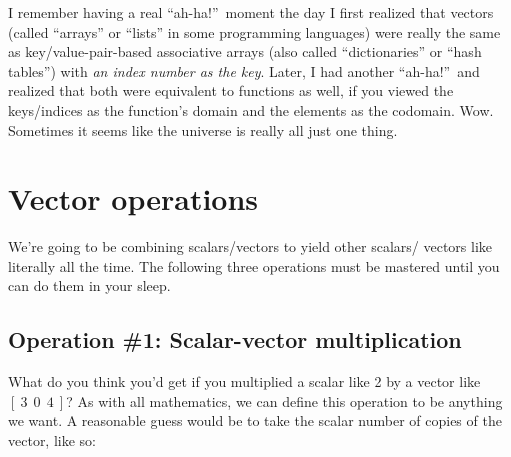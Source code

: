 
I remember having a real ``ah-ha!''~moment the day I first realized that
vectors (called ``arrays'' or ``lists'' in some programming languages) were
really the same as key/value-pair-based associative arrays (also called
``dictionaries'' or ``hash tables'') with \textit{an index number as the key}.
Later, I had another ``ah-ha!''~and realized that both were equivalent to
functions as well, if you viewed the keys/indices as the function's domain and
the elements as the codomain. Wow. Sometimes it seems like the universe is
really all just one thing.

%
%
%
%
%
%
%
%
%
%
%
%
%
%
%
%
%
%
%
%
%
%
%
%
%
%
%
%
%
%
%
%
%
%
%
%
%
%
%
%
%


\section{Vector operations}
\label{vectorOps}

We're going to be combining scalars/vectors to yield other scalars/ vectors
like literally all the time. The following three operations must be mastered
until you can do them in your sleep.

\subsection{Operation \#1: Scalar-vector multiplication}

\label{scalarVectorMultiplication}

What do you think you'd get if you multiplied a scalar like 2 by a vector like
$[\ 3\ \ 0\ \ 4\ ]$? As with all mathematics, we can define this operation to
be anything we want. A reasonable guess would be to take the scalar number of
copies of the vector, like so:

